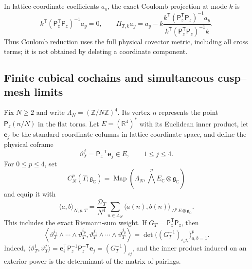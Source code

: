 \documentclass[11pt]{article}
\numberwithin{equation}{section}
\theoremstyle{definition}
\theoremstyle{remark}
\newcommand{\R}{\mathbb R}
\newcommand{\C}{\mathbb C}
\newcommand{\Z}{\mathbb Z}
\begin{document}
In lattice-coordinate coefficients $a_y$, the exact Coulomb projection at
mode $k$ is
\begin{equation}\label{eq:continuum-Coulomb-projection}
 k^{\mathsf T}(\mathsf P_z^{\mathsf T}\mathsf P_z)^{-1}a_y=0,
 \qquad
 \Pi_{T,k}a_y=a_y-k
 \frac{k^{\mathsf T}(\mathsf P_z^{\mathsf T}\mathsf P_z)^{-1}a_y}
 {k^{\mathsf T}(\mathsf P_z^{\mathsf T}\mathsf P_z)^{-1}k}.
\end{equation}
Thus Coulomb reduction uses the full physical covector metric, including all
cross terms; it is not obtained by deleting a coordinate component.

\subsection{Finite cubical cochains and simultaneous cusp--mesh limits}

Fix $N\ge2$ and write $\Lambda_N=(\Z/N\Z)^4$.  Its vertex $n$ represents
the point $\mathsf P_z(n/N)$ in the flat torus.  Let
$E=(\R^4)^*$ with its Euclidean inner product, let $\mathbf e_j$ be the
standard coordinate columns in lattice-coordinate space, and define the
physical coframe
\begin{equation}\label{eq:finite-physical-coframe}
 \vartheta_T^j=\mathsf P_z^{-\mathsf T}\mathbf e_j\in E,
 \qquad 1\le j\le4.
\end{equation}
For $0\le p\le4$, set
\begin{equation}\label{eq:finite-cochain-spaces}
 C_N^p(T;\mathfrak g_{\C})
 =\operatorname{Map}(\Lambda_N,\bigwedge^pE_{\C}\otimes\mathfrak g_{\C})
\end{equation}
and equip it with
\begin{equation}\label{eq:finite-inner-product}
 \langle a,b\rangle_{N,p,T}
 =\frac{\mathcal D_T}{N^4}\sum_{n\in\Lambda_N}
 \langle a(n),b(n)\rangle_{\wedge^pE\otimes\mathfrak g_{\C}}.
\end{equation}
This includes the exact Riemann-sum weight.  If
$G_T=\mathsf P_z^{\mathsf T}\mathsf P_z$, then
\begin{equation}\label{eq:finite-exterior-metric}
 \left\langle
 \vartheta_T^{i_1}\wedge\cdots\wedge\vartheta_T^{i_p},
 \vartheta_T^{j_1}\wedge\cdots\wedge\vartheta_T^{j_p}
 \right\rangle
 =\det\bigl((G_T^{-1})_{i_aj_b}\bigr)_{a,b=1}^p.
\end{equation}
Indeed,
$\langle\vartheta_T^i,\vartheta_T^j\rangle
=\mathbf e_i^{\mathsf T}\mathsf P_z^{-1}\mathsf P_z^{-\mathsf T}
\mathbf e_j=(G_T^{-1})_{ij}$, and the inner product induced on an exterior
power is the determinant of the matrix of pairings.
\end{document}
